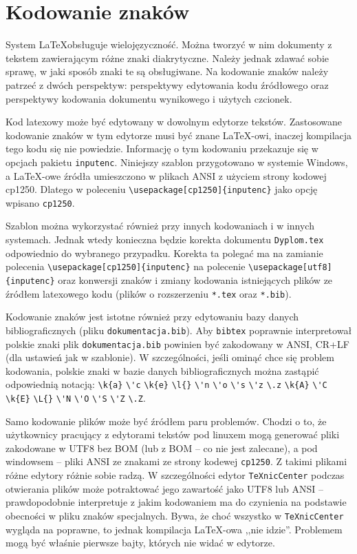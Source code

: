 \section{Kodowanie znaków}
System \LaTeX obsługuje wielojęzyczność. Można tworzyć w nim dokumenty z tekstem zawierającym różne znaki diakrytyczne. 
Należy jednak zdawać sobie sprawę, w jaki sposób znaki te są obsługiwane. Na kodowanie znaków należy patrzeć z dwóch perspektyw: perspektywy edytowania kodu źródłowego oraz perspektywy kodowania dokumentu wynikowego i użytych czcionek.

Kod latexowy może być edytowany w dowolnym edytorze tekstów. Zastosowane kodowanie znaków w tym edytorze musi być znane \LaTeX-owi, inaczej kompilacja tego kodu się nie powiedzie. Informację o tym kodowaniu przekazuje się w opcjach pakietu \texttt{inputenc}. Niniejszy szablon przygotowano w systemie Windows, a \LaTeX-owe źródła umieszczono w plikach ANSI z użyciem strony kodowej cp1250. Dlatego w poleceniu \verb+\usepackage[cp1250]{inputenc}+ jako opcję wpisano \texttt{cp1250}.


Szablon można wykorzystać również przy innych kodowaniach i w innych systemach. Jednak wtedy konieczna będzie korekta dokumentu \texttt{Dyplom.tex} odpowiednio do wybranego przypadku. Korekta ta polegać ma na zamianie polecenia \verb+\usepackage[cp1250]{inputenc}+  na polecenie \verb+\usepackage[utf8]{inputenc}+ oraz konwersji znaków i zmiany kodowania istniejących plików ze źródłem latexowego kodu (plików o rozszerzeniu \texttt{*.tex} oraz \texttt{*.bib}).

Kodowanie znaków jest istotne również przy edytowaniu bazy danych bibliograficznych (pliku \texttt{dokumentacja.bib}). Aby \texttt{bibtex} poprawnie interpretował polskie znaki plik \texttt{dokumentacja.bib} powinien być zakodowany w ANSI, CR+LF (dla ustawień jak w szablonie). 
W szczególności, jeśli ominąć chce się problem kodowania, polskie znaki w bazie danych bibliograficznych można zastąpić odpowiednią notacją: \verb|\k{a}| \verb|\'c| \verb|\k{e}| \verb|\l{}| \verb|\'n| \verb|\'o| \verb|\'s| \verb|\'z| \verb|\.z| \verb|\k{A}| \verb|\'C| \verb|\k{E}| \verb|\L{}| \verb|\'N| \verb|\'O| \verb|\'S| \verb|\'Z| \verb|\.Z|. 

Samo kodowanie plików może być źródłem paru problemów. Chodzi o to, że użytkownicy pracujący z edytorami tekstów pod linuxem mogą generować pliki zakodowane w UTF8 bez BOM (lub z BOM -- co nie jest zalecane), a pod windowsem -- pliki ANSI ze znakami ze strony kodewej \texttt{cp1250}. Z takimi plikami różne edytory różnie sobie radzą. W szczególności edytor \texttt{TeXnicCenter} podczas otwierania plików może potraktować jego zawartość jako UTF8 lub ANSI -- prawdopodobnie interpretuje z jakim kodowaniem ma do czynienia na podstawie obecności w pliku znaków specjalnych. Bywa, że choć wszystko w \texttt{TeXnicCenter} wygląda na poprawne, to jednak kompilacja \LaTeX-owa ,,nie idzie''. Problemem mogą być właśnie pierwsze bajty, których nie widać w edytorze. 

